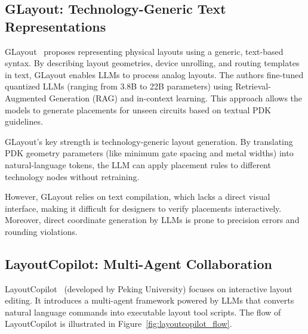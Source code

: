 \subsection{GLayout: Technology-Generic Text Representations}

GLayout~\cite{glayout} proposes representing physical layouts using a generic, text-based syntax. By describing layout geometries, device unrolling, and routing templates in text, GLayout enables LLMs to process analog layouts. The authors fine-tuned quantized LLMs (ranging from 3.8B to 22B parameters) using Retrieval-Augmented Generation (RAG) and in-context learning. This approach allows the models to generate placements for unseen circuits based on textual PDK guidelines.

GLayout's key strength is technology-generic layout generation. By translating PDK geometry parameters (like minimum gate spacing and metal widths) into natural-language tokens, the LLM can apply placement rules to different technology nodes without retraining. 

However, GLayout relies on text compilation, which lacks a direct visual interface, making it difficult for designers to verify placements interactively. Moreover, direct coordinate generation by LLMs is prone to precision errors and rounding violations.

\subsection{LayoutCopilot: Multi-Agent Collaboration}

LayoutCopilot~\cite{layoutcopilot} (developed by Peking University) focuses on interactive layout editing. It introduces a multi-agent framework powered by LLMs that converts natural language commands into executable layout tool scripts. The flow of LayoutCopilot is illustrated in Figure~\ref{fig:layoutcopilot_flow}.

